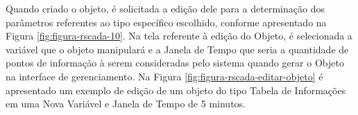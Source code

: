 \newpage

        \begin{figure}[!h]
    	\end{figure}
    	
    	\begin{figure}[!h]
    	\end{figure}
    	
Quando criado o objeto, é solicitada a edição dele para a determinação dos parâmetros referentes ao tipo específico escolhido, conforme apresentado na Figura \ref{fig:figura-rscada-10}. Na tela referente à edição do Objeto, é selecionada a variável que o objeto manipulará e a Janela de Tempo que seria a quantidade de pontos de informação à serem consideradas pelo sistema quando gerar o Objeto na interface de gerenciamento. Na Figura \ref{fig:figura-rscada-editar-objeto} é apresentado um exemplo de edição de um objeto do tipo Tabela de Informações em uma Nova Variável e Janela de Tempo de 5 minutos.
        
        \begin{figure}[!h]
    	\end{figure}

